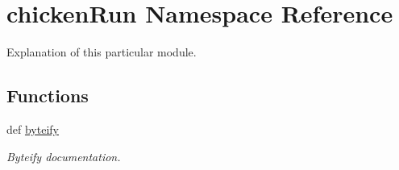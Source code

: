 \hypertarget{namespacechickenRun}{\section{chicken\-Run Namespace Reference}
\label{namespacechickenRun}
}


Explanation of this particular module.  


\subsection*{Functions}
\begin{DoxyCompactItemize}
\item 
def \hyperlink{namespacechickenRun_a0c4f189bbb7288341d427629abcada32}{byteify}
\begin{DoxyCompactList}\small\item\em Byteify documentation. \end{DoxyCompactList}\end{DoxyCompactItemize}
